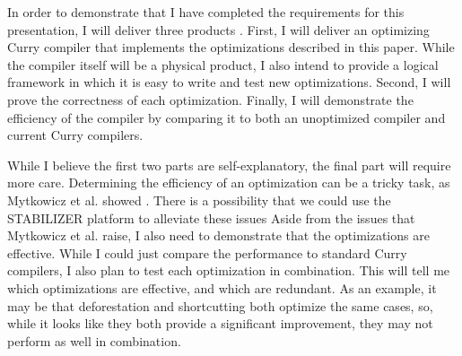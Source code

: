 
In order to demonstrate that I have completed the requirements for this presentation, I will deliver three products .
First, I will deliver an optimizing Curry compiler that implements the optimizations described in this paper.
While the compiler itself will be a physical product, I also intend to provide a logical framework
in which it is easy to write and test new optimizations.
Second, I will prove the correctness of each optimization.
Finally, I will demonstrate the efficiency of the compiler by comparing it to both an unoptimized compiler
and current Curry compilers.

While I believe the first two parts are self-explanatory, the final part will require more care.
Determining the efficiency of an optimization can be a tricky task, as Mytkowicz et al. showed \cite{wrongData}.
There is a possibility that we could use the STABILIZER platform \cite{STABILIZER} to alleviate these issues
Aside from the issues that Mytkowicz et al. raise, I also need to demonstrate that the optimizations are effective.
While I could just compare the performance to standard Curry compilers, I also plan to test each optimization in combination.
This will tell me which optimizations are effective, and which are redundant.
As an example, it may be that deforestation and shortcutting both optimize the same cases,
so, while it looks like they both provide a significant improvement, they may not perform as well in combination.


